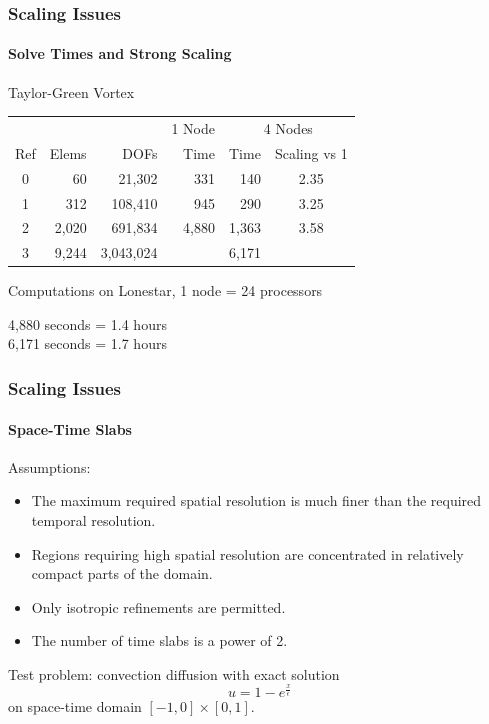 \documentclass[18pt,xcolor=table]{beamer}
\begin{document}
\begin{frame}
\frametitle{Scaling Issues}
\framesubtitle{Solve Times and Strong Scaling}  %
\begin{block}{Taylor-Green Vortex}
\begin{table}[!ht]
\centering
\begin{tabular}{|crr|r|rc|}
\hline
& & & 1 Node & \multicolumn{2}{|c|}{4 Nodes} \\
Ref& Elems & DOFs & Time    & Time & Scaling vs 1 \\
\hline
0 & 60            & 21,302      & 331    & 140    & 2.35 \\
1 & 312           & 108,410     & 945    & 290    & 3.25 \\
2 & 2,020         & 691,834     & 4,880  & 1,363  & 3.58 \\
3 & 9,244         & 3,043,024   &        & 6,171  & \\
\hline
\end{tabular}
\end{table}
\end{block}
Computations on Lonestar, 1 node = 24 processors

4,880 seconds = 1.4 hours\\
6,171 seconds = 1.7 hours
\end{frame}



\begin{frame}
\frametitle{Scaling Issues}
\framesubtitle{Space-Time Slabs}  %
Assumptions:
\begin{itemize}
\item The maximum required spatial resolution is much finer than the required temporal resolution.
\item Regions requiring high spatial resolution are concentrated in relatively compact parts of the domain.
\item Only isotropic refinements are permitted.
\item The number of time slabs is a power of 2.
\end{itemize}
Test problem: convection diffusion with exact solution
\[
u=1-e^\frac{x}{\epsilon}
\]
on space-time domain $[-1,0]\times[0,1]$.
\end{frame}
\end{document}

